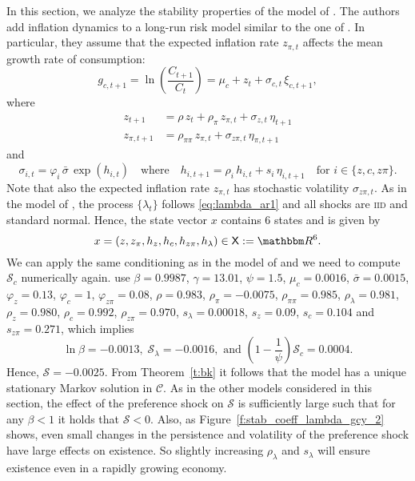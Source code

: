 \documentclass[12pt, reqno]{amsart}
\newcommand{\1}{\mathbbm 1}
\newcommand{\cC}{\mathscr C}
\newcommand{\sS}{\mathscr S}
\newcommand{\RR}{\mathbbm R}
\renewcommand{\phi}{\varphi}
\newcommand{\XX}{\mathsf X}
\theoremstyle{plain}
\theoremstyle{definition}
\begin{document}
In this section, we analyze the stability properties of the model of \cite{GomezYaron2020}. The authors add inflation dynamics to a long-run risk model similar to the one of 
\cite{schorfheide2018identifying}. In particular, they assume that the expected inflation rate $z_{\pi,t}$ affects the mean growth rate of consumption:
%
\begin{equation}\label{eq:gcycg}
	g_{c, t+1} 
	= \ln \left( \frac{C_{t+1}}{C_t} \right)    
	= \mu_c + z_t + \sigma_{c, t} \, \xi_{c, t+1},
\end{equation}
%
where
%
\begin{align*}
	z_{t+1} 
	&= \rho \, z_t + \rho_{\pi} \, z_{\pi,t}+ 
	\sigma_{z, t} \, \eta_{t+1}\\
	z_{\pi,t+1} 
	&= \rho_{\pi \pi} \, z_{\pi,t} + \sigma_{z \pi, t} \, \eta_{\pi,t+1}
\end{align*}
%
and
%
\begin{equation*}
	\sigma_{i,t} 
	= \phi_i \, \bar{\sigma} \, \exp(h_{i, t})
	\quad \text{where} \quad
	h_{i, t+1}
	= \rho_i \, h_{i,t} + s_i \, \eta_{i, t+1}
	\quad \text{for } i \in \{z, c, z\pi \}.
\end{equation*}
%
Note that also the expected inflation rate $z_{\pi,t}$ has stochastic volatility $\sigma_{z\pi,t}$. As in the model of \cite{schorfheide2018identifying}, the process $\{\lambda_t\}$ follows
\eqref{eq:lambda_ar1} and all shocks are \textsc{iid} and standard normal. Hence, the state vector $x$ contains 6 states and is given by
%
\begin{equation*}
    x = (z, z_\pi, h_z, h_c, h_{z\pi}, h_\lambda) \in \XX := \RR^6. 
\end{equation*}
%
We can apply the same conditioning as in the model of
\cite{schorfheide2018identifying} and we need to compute $\sS_c$ numerically
again. \cite{GomezYaron2020} use $\beta = 0.9987$, $\gamma = 13.01$, $\psi =
1.5$, $\mu_c = 0.0016$, $\bar{\sigma} = 0.0015$, $\phi_z = 0.13$, $\phi_c =
1$, $\phi_{z\pi} = 0.08$, $\rho = 0.983$, $\rho_{\pi} = -0.0075$,
$\rho_{\pi\pi} = 0.985$, $\rho_\lambda = 0.981$, $\rho_z = 0.980$, $\rho_c =
0.992$, $\rho_{z\pi} = 0.970$, $s_\lambda = 0.00018$, $s_z = 0.09$, $s_c =
0.104$ and $s_{z\pi} = 0.271$, which implies
%
\begin{equation*}
\ln \beta = -0.0013,\; \sS_\lambda = -0.0016, \text{ and }
\left(1-\frac{1}{\psi}\right) \sS_c = 0.0004.
\end{equation*}
%
Hence, $\sS = -0.0025$. From Theorem~\ref{t:bk} it follows that the model has a unique stationary
Markov solution in $\cC$. As in the other models considered in this section, the effect of the preference shock on $\sS$ is sufficiently large such that for any $\beta < 1$ it holds that $\sS < 0$. Also, as Figure~\ref{f:stab_coeff_lambda_gcy_2} shows, even small changes in the persistence and volatility of the preference shock have large effects on existence. So slightly increasing $\rho_\lambda $ and $s_\lambda$ will ensure existence even in a rapidly growing economy.
\end{document}
